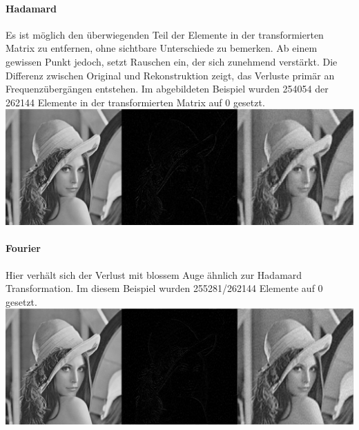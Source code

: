 \paragraph{Hadamard}
Es ist m\"oglich den \"uberwiegenden Teil der Elemente in der transformierten 
Matrix zu entfernen, ohne sichtbare Unterschiede zu bemerken. Ab einem gewissen
Punkt jedoch, setzt Rauschen ein, der sich zunehmend verst\"arkt. Die Differenz
zwischen Original und Rekonstruktion zeigt, das Verluste prim\"ar an Frequenz\"uberg\"angen
entstehen. Im abgebildeten Beispiel wurden 254054 der 262144 Elemente in der transformierten
Matrix auf $0$ gesetzt.
\\
\includegraphics[width=150mm]{u01/h_out.eps}


\paragraph{Fourier}
Hier verh\"alt sich der Verlust mit blossem Auge \"ahnlich zur Hadamard Transformation. Im diesem Beispiel
wurden 255281/262144 Elemente auf $0$ gesetzt.
\\

\includegraphics[width=150mm]{u01/f_out.eps}

